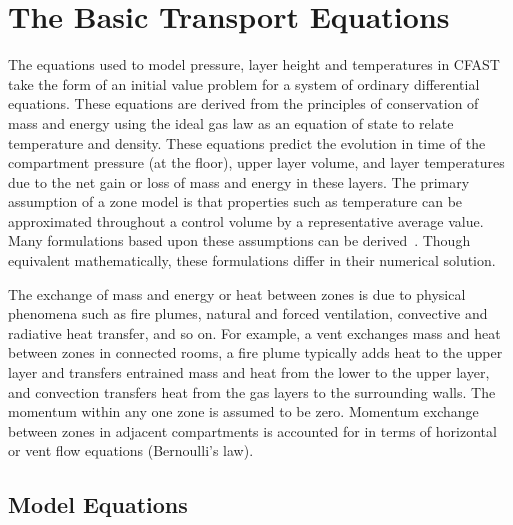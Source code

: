 \documentclass[12pt,twoside]{book}
\begin{document}
%
%

\chapter{The Basic Transport Equations}
\label{sec:Theory_Chapter}

The equations used to model pressure, layer height and temperatures in CFAST take the form of an initial value problem for a system of ordinary differential equations. These equations are derived from the principles of conservation of mass and energy using the ideal gas law as an equation of state to relate temperature and density. These equations predict the evolution in time of the compartment pressure (at the floor), upper layer volume, and layer temperatures due to the net gain or loss of mass and energy in these layers. The primary assumption of a zone model is that properties such as temperature can be approximated throughout a control volume by a representative average value. Many formulations based upon these assumptions can be derived~\cite{Forney:1994}. Though equivalent mathematically, these formulations differ in their numerical solution.

The exchange of mass and energy or heat between zones is due to physical phenomena such as fire plumes, natural and forced ventilation, convective and radiative heat transfer, and so on. For example, a vent exchanges mass and heat between zones in connected rooms, a fire plume typically adds heat to the upper layer and transfers entrained mass and heat from the lower to the upper layer, and convection transfers heat from the gas layers to the surrounding walls.  The momentum within any one zone is assumed to be zero. Momentum exchange between zones in adjacent compartments is accounted for in terms of horizontal or vent flow equations (Bernoulli's law).

\section{Model Equations}
\label{sect:equations}
\end{document}
